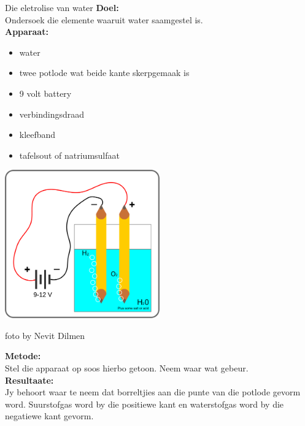 \begin{g_experiment}{Die eletrolise van water}
\textbf{Doel:} \\
Ondersoek die elemente waaruit water saamgestel is.\\
\textbf{Apparaat:}\\
\begin{minipage}{.4\textwidth}
\begin{itemize}[noitemsep]
 \item water
\item twee potlode wat beide kante skerpgemaak is
\item 9 volt battery
\item verbindingsdraad
\item kleefband
\item tafelsout of natriumsulfaat
\end{itemize}
\end{minipage}
\begin{minipage}{.6\textwidth} 
\begin{center}
   \includegraphics[width=0.5\textwidth]{photos/electrolysis.png}\\
\begin{caption}foto by Nevit Dilmen\end{caption}
\end{center}
\end{minipage} \nopagebreak
\textbf{Metode:}\\
Stel die apparaat op soos hierbo getoon. Neem waar wat gebeur.\\
\textbf{Resultaate:}\\
Jy behoort waar te neem dat borreltjies aan die punte van die potlode gevorm word. Suurstofgas word by die positiewe kant en waterstofgas word by die negatiewe kant gevorm.
\end{g_experiment}
\vspace{-.5cm}
